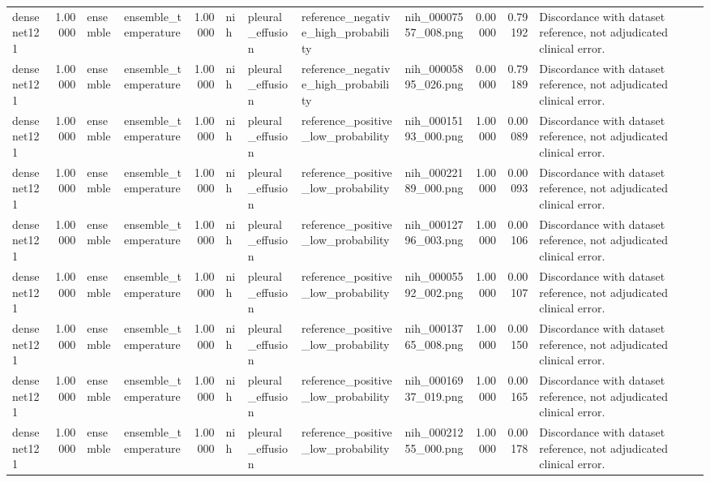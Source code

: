 \begin{tabular}{lrllrllllrrl}
densenet121 & 1.00000 & ensemble & ensemble\_temperature & 1.00000 & nih & pleural\_effusion & reference\_negative\_high\_probability & nih\_00007557\_008.png & 0.00000 & 0.79192 & Discordance with dataset reference, not adjudicated clinical error. \\
densenet121 & 1.00000 & ensemble & ensemble\_temperature & 1.00000 & nih & pleural\_effusion & reference\_negative\_high\_probability & nih\_00005895\_026.png & 0.00000 & 0.79189 & Discordance with dataset reference, not adjudicated clinical error. \\
densenet121 & 1.00000 & ensemble & ensemble\_temperature & 1.00000 & nih & pleural\_effusion & reference\_positive\_low\_probability & nih\_00015193\_000.png & 1.00000 & 0.00089 & Discordance with dataset reference, not adjudicated clinical error. \\
densenet121 & 1.00000 & ensemble & ensemble\_temperature & 1.00000 & nih & pleural\_effusion & reference\_positive\_low\_probability & nih\_00022189\_000.png & 1.00000 & 0.00093 & Discordance with dataset reference, not adjudicated clinical error. \\
densenet121 & 1.00000 & ensemble & ensemble\_temperature & 1.00000 & nih & pleural\_effusion & reference\_positive\_low\_probability & nih\_00012796\_003.png & 1.00000 & 0.00106 & Discordance with dataset reference, not adjudicated clinical error. \\
densenet121 & 1.00000 & ensemble & ensemble\_temperature & 1.00000 & nih & pleural\_effusion & reference\_positive\_low\_probability & nih\_00005592\_002.png & 1.00000 & 0.00107 & Discordance with dataset reference, not adjudicated clinical error. \\
densenet121 & 1.00000 & ensemble & ensemble\_temperature & 1.00000 & nih & pleural\_effusion & reference\_positive\_low\_probability & nih\_00013765\_008.png & 1.00000 & 0.00150 & Discordance with dataset reference, not adjudicated clinical error. \\
densenet121 & 1.00000 & ensemble & ensemble\_temperature & 1.00000 & nih & pleural\_effusion & reference\_positive\_low\_probability & nih\_00016937\_019.png & 1.00000 & 0.00165 & Discordance with dataset reference, not adjudicated clinical error. \\
densenet121 & 1.00000 & ensemble & ensemble\_temperature & 1.00000 & nih & pleural\_effusion & reference\_positive\_low\_probability & nih\_00021255\_000.png & 1.00000 & 0.00178 & Discordance with dataset reference, not adjudicated clinical error. \\

\end{tabular}
